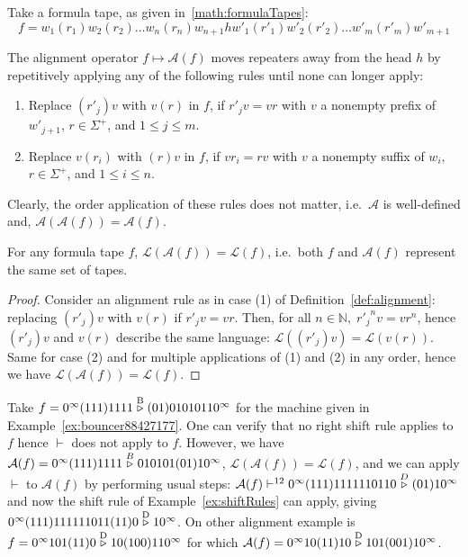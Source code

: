 \begin{definition}\label{def:alignment}
    Take a formula tape, as given in~\eqref{math:formulaTapes}: $$f = w_1(r_1)w_2(r_2)\dots w_n(r_n) w_{n+1} h w'_1(r'_1)w'_2(r'_2)\dots w'_m(r'_m) w'_{m+1}$$

    The alignment operator $f \mapsto \mathcal{A}(f)$ moves repeaters away from the head $h$ by repetitively applying any of the following rules until none can longer apply:
    \begin{enumerate}
        \item Replace $(r'_{j})v$ with $v(r)$ in $f$, if $r'_j v = v r$ with $v$ a nonempty prefix of $w'_{j+1}$, $r\in\Sigma^+$, and $1 \leq j \leq m$.

        \item Replace $v(r_{i})$ with $(r)v$ in $f$, if $v r_i = r v$ with $v$ a nonempty suffix of $w_{i}$, $r\in\Sigma^+$, and $1 \leq i \leq n$.
    \end{enumerate}

    Clearly, the order application of these rules does not matter, i.e.\ $\mathcal{A}$ is well-defined and, $\mathcal{A}(\mathcal{A}(f)) = \mathcal{A}(f)$.
\end{definition}



\begin{lemma}\label{lem:sameLanguage} For any formula tape $f$, $\mathcal{L}(\mathcal{A}(f)) = \mathcal{L}(f)$, i.e.\ both $f$ and $\mathcal{A}(f)$ represent the same set of tapes.
\end{lemma}

\begin{proof}
    Consider an alignment rule as in case (1) of Definition~\ref{def:alignment}: replacing $(r'_{j})v$ with $v(r)$ if $r'_j v = v r$. Then, for all $n\in\mathbb{N},\; {r'_j}^n v = v r^n$, hence $(r'_{j})v$ and $v(r)$ describe the same language: $\mathcal{L}((r'_{j})v) = \mathcal{L}(v(r))$. Same for case (2) and for multiple applications of (1) and (2) in any order, hence we have $\mathcal{L}(\mathcal{A}(f)) = \mathcal{L}(f)$.
\end{proof}

\begin{example}\label{ex:alignment}
    Take $f=0^\infty(111)1111\stackrel{\text{B}}\triangleright(01)01010110^\infty$ for the machine given in Example~\ref{ex:bouncer88427177}. One can verify that no right shift rule applies to $f$ hence $\vdash$ does not apply to $f$. However, we have $ \mathcal{A}(f)=0^\infty(111)1111\stackrel{B}\triangleright010101(01)10^\infty$, $\mathcal{L}(\mathcal{A}(f)) = \mathcal{L}(f)$, and we can apply $\vdash$ to $ \mathcal{A}(f)$ by performing usual steps: $ \mathcal{A}(f) \vdash^{12} 0^\infty(111)1111110110 \stackrel{D}\triangleright (01)10^\infty$ and now the shift rule of Example~\ref{ex:shiftRules} can apply, giving $0^\infty(111)111111011(11)0 \stackrel{\text{D}}\triangleright 10^\infty$.
    On other alignment example is $f=0^\infty 101(11)0 \stackrel{\text{D}}\triangleright 10 (100) 11 0^\infty$ for which $\mathcal{A}(f) = 0^\infty 10(11)10 \stackrel{\text{D}}\triangleright 101(001)10^\infty$.
\end{example}





